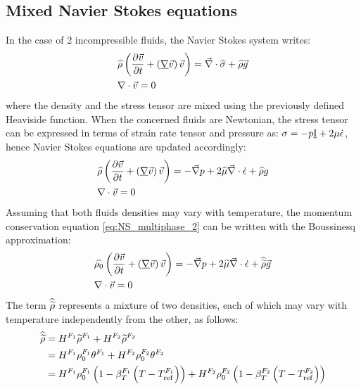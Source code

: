 \documentclass[11pt,a4paper]{article}
\begin{document}
\subsection{Mixed Navier Stokes equations}
In the case of 2 incompressible fluids, the Navier Stokes system writes: 
\begin{align}
\label{eq:NS_multiphase}
& \widehat{\rho} \left( \frac{\partial \vec{v}}{\partial t} + \left( \underline{\nabla} \vec{v} \right) \vec{v}  \right) = \vec{\nabla} \cdot \widehat{\sigma} + \widehat{\rho} \vec{g} \\ 
& \nabla \cdot \vec{v} = 0
\end{align}
where the density and the stress tensor are mixed using the previously defined Heaviside function. When the concerned fluids 
are Newtonian, the stress tensor can be expressed in terms of strain rate tensor and pressure as: $\sigma = -p \underline{\text{I}} +  2\mu \dot{\epsilon}$, 
hence Navier Stokes equations are updated accordingly:
\begin{align}
\label{eq:NS_multiphase_2}
& \widehat{\rho} \left( \frac{\partial \vec{v}}{\partial t} + \left( \underline{\nabla} \vec{v} \right) \vec{v}  \right) = - \vec{\nabla} p + 2\widehat{\mu} \vec{\nabla} \cdot \dot{\epsilon} + \widehat{\rho} g \\ 
& \nabla \cdot \vec{v} = 0
\end{align}
Assuming that both fluids densities may vary with temperature, the momentum conservation equation \eqref{eq:NS_multiphase_2}
can be written with the Boussinesq approximation:
\begin{align}
\label{eq:NS_multiphase_boussinesq}
& \widehat{\rho_0} \left( \frac{\partial \vec{v}}{\partial t} + \left( \underline{\nabla} \vec{v} \right) \vec{v}  \right) = - \vec{\nabla} p + 2\widehat{\mu} \vec{\nabla} \cdot \dot{\epsilon} + \widehat{\widetilde{\rho}} \vec{g} \\ 
& \nabla \cdot \vec{v} = 0
\end{align}
The term $\widehat{\widetilde{\rho}}$ represents a mixture of two densities, each of which may vary with temperature independently from the other,
as follows:
\begin{align}
\label{eq:boussinesq_mix}
\widehat{\widetilde{\rho}} &= H^{F_1} \widetilde{\rho}^{F_1} + H^{F_2} \widetilde{\rho}^{F_2} \\
				&= H^{F_1} \rho_0^{F_1} \theta^{F_1} + H^{F_2} \rho_0^{F_2} \theta^{F_2} \\
				&= H^{F_1} \rho_0^{F_1} \left( 1-\beta_T^{F_1} \left( T-T_{\text{ref}}^{F_1} \right) \right) + H^{F_2} \rho_0^{F_2} \left( 1-\beta_T^{F_2} \left( T-T_{\text{ref}}^{F_2} \right) \right)
\end{align}
\end{document}
